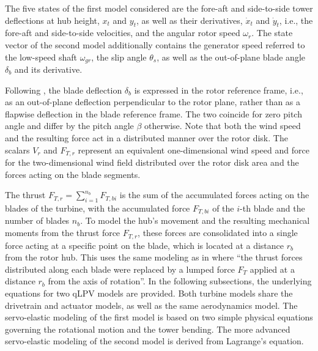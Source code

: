 The five states of the first model considered are the fore-aft and side-to-side tower deflections at hub height, $x_t$ and $y_t$, as well as their derivatives, $\dot{x}_t$ and $\dot{y}_t$, i.e., the fore-aft and side-to-side velocities, and the angular rotor speed $\omega_r$.
The state vector of the second model additionally contains the generator speed referred to the low-speed shaft $\omega_{gr}$, the slip angle $\theta_s$, as well as the out-of-plane blade angle $\delta_b$ and its derivative.

Following \cite{Bianchi2007}, the blade deflection $\delta_b$ is expressed in the rotor reference frame, i.e., as an out-of-plane deflection perpendicular to the rotor plane, rather than as a flapwise deflection in the blade reference frame. The two coincide for zero pitch angle and differ by the pitch angle $\beta$ otherwise. Note that both the wind speed and the resulting force act in a distributed manner over the rotor disk. The scalars $V_r$ and $F_{T,r}$ represent an equivalent one-dimensional wind speed and force for the two-dimensional wind field distributed over the rotor disk area and the forces acting on the blade segments.

The thrust $F_{T,r} = \sum_{i=1}^{n_b} F_{T,bi}$ is the sum of the accumulated forces acting on the blades of the turbine, with the accumulated force $F_{T,bi}$ of the $i$-th blade and the number of blades $n_b$. To model the hub's movement and the resulting mechanical moments from the thrust force $F_{T,r}$, these forces are consolidated into a single force acting at a specific point on the blade, which is located at a distance $r_b$ from the rotor hub. This uses the same modeling as in \cite{Bianchi2007} where ``the thrust forces distributed along each blade were replaced by a lumped force $F_T$ applied at a distance $r_b$ from the axis of rotation''. 
In the following subsections, the underlying equations for two qLPV models are provided. Both turbine models share the drivetrain and actuator models, as well as the same aerodynamics model. The servo-elastic modeling of the first model is based on two simple physical equations governing the rotational motion and the tower bending. The more advanced servo-elastic modeling of the second model is derived from Lagrange's equation.

